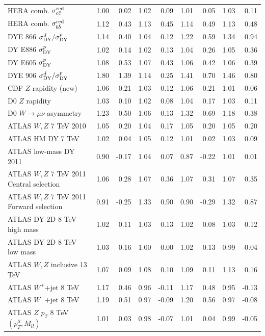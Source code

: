 \documentclass[withindex,glossary]{cam-thesis}
\begin{document}
\begin{table}[H]
\begin{tabular}{lrrrrrrrr}
HERA comb. $\sigma_{c\bar c}^{\rm red}$ & 1.00 & 0.02 & 1.02 & 0.09 & 1.01 & 0.05 & 1.03 & 0.11 \\
HERA comb. $\sigma_{b\bar b}^{\rm red}$ & 1.12 & 0.43 & 1.13 & 0.45 & 1.14 & 0.49 & 1.13 & 0.48 \\
DYE 866 $\sigma^d_{\rm DY}/\sigma^p_{\rm DY}$ & 1.14 & 0.40 & 1.04 & 0.12 & 1.22 & 0.59 & 1.34 & 0.94 \\
DY E886 $\sigma^p_{\rm DY}$ & 1.02 & 0.14 & 1.02 & 0.13 & 1.04 & 0.26 & 1.05 & 0.36 \\
DY E605 $\sigma^p_{\rm DY}$ & 1.08 & 0.53 & 1.07 & 0.43 & 1.06 & 0.42 & 1.06 & 0.39 \\
DYE 906 $\sigma^d_{\rm DY}/\sigma^p_{\rm DY}$ & 1.80 & 1.39 & 1.14 & 0.25 & 1.41 & 0.70 & 1.46 & 0.80 \\
CDF $Z$ rapidity (new) & 1.06 & 0.21 & 1.03 & 0.12 & 1.06 & 0.21 & 1.01 & 0.06 \\
D0 $Z$ rapidity & 1.03 & 0.10 & 1.02 & 0.08 & 1.04 & 0.17 & 1.03 & 0.11 \\
D0 $W\to \mu\nu$ asymmetry & 1.23 & 0.50 & 1.06 & 0.13 & 1.32 & 0.69 & 1.18 & 0.38 \\
ATLAS $W,Z$ 7 TeV 2010 & 1.05 & 0.20 & 1.04 & 0.17 & 1.05 & 0.20 & 1.05 & 0.20 \\
ATLAS HM DY 7 TeV & 1.02 & 0.04 & 1.05 & 0.12 & 1.01 & 0.02 & 1.03 & 0.09 \\
ATLAS low-mass DY 2011 & 0.90 & -0.17 & 1.04 & 0.07 & 0.87 & -0.22 & 1.01 & 0.01 \\
ATLAS $W,Z$ 7 TeV 2011 Central selection & 1.06 & 0.28 & 1.07 & 0.36 & 1.07 & 0.31 & 1.07 & 0.35 \\
ATLAS $W,Z$ 7 TeV 2011 Forward selection & 0.91 & -0.25 & 1.33 & 0.90 & 0.90 & -0.29 & 1.32 & 0.87 \\
ATLAS DY 2D 8 TeV high mass & 1.02 & 0.11 & 1.03 & 0.13 & 1.02 & 0.08 & 1.03 & 0.12 \\
ATLAS DY 2D 8 TeV low mass & 1.03 & 0.16 & 1.00 & 0.00 & 1.02 & 0.13 & 0.99 & -0.04 \\
ATLAS $W,Z$ inclusive 13 TeV & 1.07 & 0.09 & 1.08 & 0.10 & 1.09 & 0.11 & 1.13 & 0.16 \\
ATLAS $W^+$+jet 8 TeV & 1.17 & 0.46 & 0.96 & -0.11 & 1.17 & 0.48 & 0.95 & -0.13 \\
ATLAS $W^-$+jet 8 TeV & 1.19 & 0.51 & 0.97 & -0.09 & 1.20 & 0.56 & 0.97 & -0.08 \\
ATLAS $Z$ $p_T$ 8 TeV $(p_T^{ll},M_{ll})$ & 1.01 & 0.03 & 0.98 & -0.07 & 1.01 & 0.04 & 0.99 & -0.05 \\

\end{tabular}
\end{table}
\end{document}
